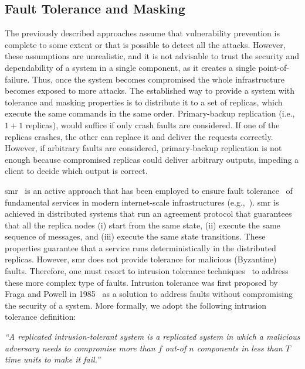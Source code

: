 \subsection{Fault Tolerance and Masking}
The previously described approaches assume that vulnerability prevention is complete to some extent or that is possible to detect all the attacks.
However, these assumptions are unrealistic, and it is not advisable to trust the security and dependability of a system in a single component, as it creates a single point-of-failure. 
Thus, once the system becomes compromised the whole infrastructure becomes exposed to more attacks. 
The established way to provide a system with tolerance and masking properties is to distribute it to a set of replicas, which execute the same commands in the same order. 
Primary-backup replication (i.e., $1 + 1$ replicas), would suffice if only crash faults are considered. 
If one of the replicas crashes, the other can replace it and deliver the requests correctly.
However, if arbitrary faults are considered, primary-backup replication is not enough because compromised replicas could deliver arbitrary outputs, impeding a client to decide which output is correct.

\gls{smr}~\cite{Lamport:1984} is an active approach that has been employed to ensure fault tolerance~\cite{Schneider:1990} of fundamental services in modern internet-scale infrastructures (e.g.,~\cite{Hunt:2010,Calder:2011,Corbett:2013}).
\gls{smr} is achieved in distributed systems that run an agreement protocol that guarantees that all the replica nodes (i) start from the same state, (ii) execute the same sequence of messages, and (iii) execute the same state transitions. 
These properties guarantee that a service runs deterministically in the distributed replicas.
However, \gls{smr} does not provide tolerance for malicious (Byzantine) faults.
Therefore, one must resort to intrusion tolerance techniques~\cite{Verissimo:2003} to address these more complex type of faults.
Intrusion tolerance was first proposed by Fraga and Powell in 1985~\cite{Fraga:1985} as a solution to address faults without compromising the security of a system. 
More formally, we adopt the following intrusion tolerance definition: 

\begin{defn}
\emph{``A replicated intrusion-tolerant system is a replicated system in which a malicious adversary needs to compromise more than $f$ out-of $n$ components in less than $T$ time units to make it fail.''}~\cite{Bessani:2011}
\label{def:def2}
\end{defn}

